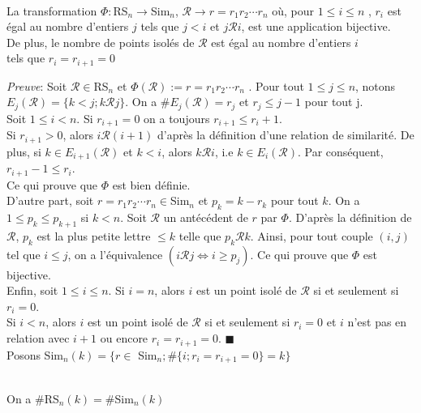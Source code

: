 \begin{proposition} \label{Phi_bijection} \text{ }\\
	La transformation $\Phi: $RS$_{n} \rightarrow $Sim$_{n}$, $\mathcal{R} \rightarrow r = r_{1}r_{2}\cdots r_{n}$ où, pour $1\leq i \leq n$ , $r_{i}$ est égal au nombre d'entiers $j$ tels que $j<i$ et $j\mathcal{R}i$, est une application bijective.\\ De plus, le nombre de points isolés de $\mathcal{R}$ est égal au nombre d'entiers $i$ \\tels que $r_{i}=r_{i+1}=0$ %
\end{proposition}
\textit{Preuve}:
Soit $\mathcal{R} \in $RS$_{n}$ et $\Phi(\mathcal{R}):= r = r_{1}r_{2}\cdots r_{n}$ . Pour tout $1\leq j \leq n$, notons $E_{j}(\mathcal{R})=\{k<j; k \mathcal{R} j \}$. On a $\# E_{j}(\mathcal{R})=r_{j}$ et $r_{j}\leq j-1$ pour tout j.\\ Soit $1\leq i < n$. Si $r_{i+1}=0$ on a toujours $r_{i+1}\leq r_{i}+1$.\\
Si $r_{i+1}>0$, alors $i\mathcal{R}(i+1)$ d'après la définition d'une relation de similarité. De plus, si $k\in E_{i+1}(\mathcal{R})$ et $k<i$, alors $k\mathcal{R}i$, i.e $k\in E_{i}(\mathcal{R})$. Par conséquent, $r_{i+1}-1 \leq r_{i}$. \\Ce qui prouve que $\Phi$ est bien définie.\vspace{5pt}\\
D'autre part, soit $r=r_{1}r_{2}\cdots r_{n}\in $Sim$_{n}$ et $p_{k}=k-r_{k}$ pour tout $k$. On a $1\leq p_{k}\leq p_{k+1}$ si $k<n$.
Soit $\mathcal{R}$ un antécédent de $r$ par $\Phi$. D'après la définition de $\mathcal{R}$, $p_{k}$ est la plus petite lettre $\leq k$ telle que $p_{k}\mathcal{R}k$. Ainsi, pour tout couple $(i, j)$ tel que $i\leq j$, on a l'équivalence $(i\mathcal{R}j \iff i \geq p_{j})$. Ce qui prouve que $\Phi$ est bijective.\vspace{10pt}\\
Enfin, soit $1\leq i \leq n$. Si $i=n$, alors $i$ est un point isolé de $\mathcal{R}$ si et seulement si $r_{i}=0$.\\
Si $i<n$, alors $i$ est un point isolé de $\mathcal{R}$ si et seulement si $r_{i}=0$ et $i$ n'est pas en relation avec $i+1$ ou encore $r_{i}=r_{i+1}=0$. $\blacksquare$\\
Posons Sim$_{n}(k)=\{r \in $ Sim$_{n}; \#\{i; r_{i}=r_{i+1}=0\}=k\}$ 
\begin{corollaire} \label{sr_eq_sim} \text{ }\\
	On a $\#$\rm{RS}$_{n}(k) = \#$\rm{Sim}$_{n}(k)$
\end{corollaire}

